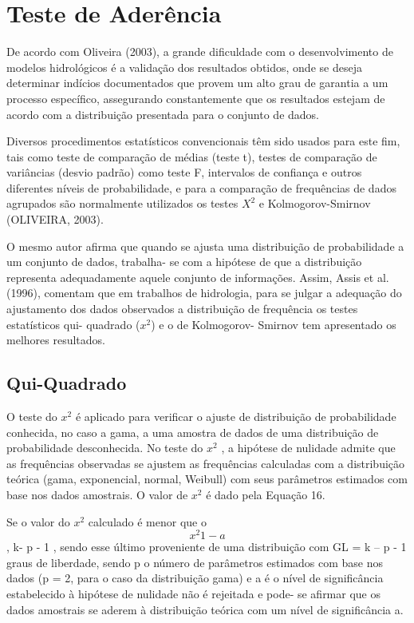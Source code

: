 \section{Teste de Aderência}

De acordo com Oliveira (2003), a grande dificuldade com o desenvolvimento de modelos hidrológicos é a validação dos resultados obtidos, onde se deseja determinar indícios documentados que provem um alto grau de garantia a um processo específico, assegurando constantemente que os resultados estejam de acordo com a distribuição presentada para o conjunto de dados.

Diversos procedimentos estatísticos convencionais têm sido usados para este fim, tais como teste de comparação de médias (teste t), testes de comparação de variâncias (desvio padrão) como teste F, intervalos de confiança e outros diferentes níveis de probabilidade, e para a comparação de frequências de dados agrupados são normalmente utilizados os testes $X^2$ e Kolmogorov-Smirnov (OLIVEIRA, 2003).

O mesmo autor afirma que quando se ajusta uma distribuição de probabilidade a um conjunto de dados, trabalha- se com a hipótese de que a distribuição representa adequadamente aquele conjunto de informações.
Assim, Assis et al. (1996), comentam que em trabalhos de hidrologia, para se julgar a adequação do ajustamento dos dados observados a distribuição de frequência os testes estatísticos qui- quadrado ($x^2$) e o de Kolmogorov- Smirnov tem apresentado os melhores resultados.

\subsection{Qui-Quadrado}

O teste do $x^2$ é aplicado para verificar o ajuste de distribuição de probabilidade conhecida, no caso a gama, a uma amostra de dados de uma distribuição de probabilidade desconhecida. No teste do $x^2$ , a hipótese de nulidade admite que as frequências observadas se ajustem as frequências calculadas com a distribuição teórica (gama, exponencial, normal, Weibull) com seus parâmetros estimados com base nos dados amostrais. O valor de $x^2$ é dado pela Equação 16.

Se o valor do $x^2$  calculado é menor que o $$x^2 1 - a$$, k- p - 1 , sendo esse último proveniente de uma distribuição com GL = k – p - 1 graus de liberdade, sendo p o número de parâmetros estimados com base nos dados (p = 2, para o caso da distribuição gama) e a é o nível de significância estabelecido à hipótese de nulidade não é rejeitada e pode- se afirmar que os dados amostrais se aderem à distribuição teórica com um nível de significância a.

